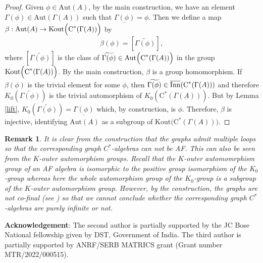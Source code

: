 \documentclass[a4paper,11pt,reqno]{amsart}
\theoremstyle{plain}
\newtheorem{rem}[thm]{Remark}
\theoremstyle{named}
\numberwithin{equation}{section}
\begin{document}
                        \begin{proof}
                            Given $\phi\in \textrm {Aut}(A)$, by the main construction, we have an element $\Gamma(\phi)\in\textrm {Aut}(\Gamma(A))$ such that $\underline{\Gamma(\phi)}=\phi$. Then we define a map $\beta:\textrm {Aut}(A)\rightarrow {\rm Kout}\Big(\textrm{C}^{\ast}(\Gamma(A))\Big)$ by
                            \begin{displaymath}
                                \beta(\phi)=[\widetilde{\Gamma(\phi)}],
                            \end{displaymath}
                            where $[\widetilde{\Gamma(\phi)}]$ is the class of $\widetilde{\Gamma(\phi)}\in{\rm Aut}\Big(\textrm{C}^{\ast}(\Gamma(A))\Big)$ in the group ${\rm Kout}\Big(\textrm{C}^{\ast}(\Gamma(A))\Big)$. By the main construction, $\beta$ is a group homomorphism. If $\beta(\phi)$ is the trivial element for some $\phi$, then $\widetilde{\Gamma(\phi)}\in\overline{\rm Inn}(\textrm{C}^{\ast}(\Gamma(A)))$ and therefore $K_{0}(\widetilde{\Gamma(\phi)})$ is the trivial automorphism of $K_{0}(\textrm{C}^{\ast}(\Gamma(A)))$. But by Lemma \ref{lift}, $K_{0}(\widetilde{\Gamma(\phi)})=\underline{\Gamma(\phi)}$ which, by construction, is $\phi$. Therefore, $\beta$ is injective, identifying $\textrm {Aut}(A)$ as a subgroup of $\textrm {Kout}\Big(\textrm{C}^{\ast}(\Gamma(A))\Big)$.
                        \end{proof}
                        \begin{rem}
                            It is clear from the construction that the graphs admit multiple loops so that the corresponding graph $C^{\ast}$-algebras can not be AF. This can also be seen from the $K$-outer automorphism groups. Recall that the $K$-outer automomrphism group of an AF algebra is isomorphic to the positive group isomorphism of the $K_{0}$-group whereas here the whole automorphism group of the $K_{0}$-group is a subgroup of the $K$-outer automorphism group. However, by the construction, the graphs are not co-final (see \cite{raeburn}) so that we cannot conclude whether the corresponding graph $C^{\ast}$-algebras are purely infinite or not. 
                        \end{rem}
                        {\bf Acknowledgement}: The second author is partially supported by the JC Bose National fellowship given by DST, Government of India. The third author is partially supported by ANRF/SERB MATRICS grant (Grant number MTR/2022/000515). 
\end{document}
